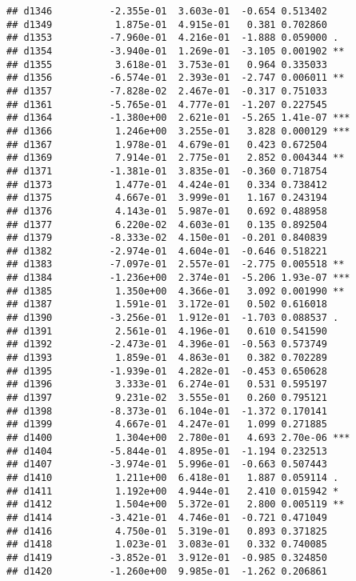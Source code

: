 \documentclass[
]{article}
\begin{document}
\begin{verbatim}
## d1346          -2.355e-01  3.603e-01  -0.654 0.513402    
## d1349           1.875e-01  4.915e-01   0.381 0.702860    
## d1353          -7.960e-01  4.216e-01  -1.888 0.059000 .  
## d1354          -3.940e-01  1.269e-01  -3.105 0.001902 ** 
## d1355           3.618e-01  3.753e-01   0.964 0.335033    
## d1356          -6.574e-01  2.393e-01  -2.747 0.006011 ** 
## d1357          -7.828e-02  2.467e-01  -0.317 0.751033    
## d1361          -5.765e-01  4.777e-01  -1.207 0.227545    
## d1364          -1.380e+00  2.621e-01  -5.265 1.41e-07 ***
## d1366           1.246e+00  3.255e-01   3.828 0.000129 ***
## d1367           1.978e-01  4.679e-01   0.423 0.672504    
## d1369           7.914e-01  2.775e-01   2.852 0.004344 ** 
## d1371          -1.381e-01  3.835e-01  -0.360 0.718754    
## d1373           1.477e-01  4.424e-01   0.334 0.738412    
## d1375           4.667e-01  3.999e-01   1.167 0.243194    
## d1376           4.143e-01  5.987e-01   0.692 0.488958    
## d1377           6.220e-02  4.603e-01   0.135 0.892504    
## d1379          -8.333e-02  4.150e-01  -0.201 0.840839    
## d1382          -2.974e-01  4.604e-01  -0.646 0.518221    
## d1383          -7.097e-01  2.557e-01  -2.775 0.005518 ** 
## d1384          -1.236e+00  2.374e-01  -5.206 1.93e-07 ***
## d1385           1.350e+00  4.366e-01   3.092 0.001990 ** 
## d1387           1.591e-01  3.172e-01   0.502 0.616018    
## d1390          -3.256e-01  1.912e-01  -1.703 0.088537 .  
## d1391           2.561e-01  4.196e-01   0.610 0.541590    
## d1392          -2.473e-01  4.396e-01  -0.563 0.573749    
## d1393           1.859e-01  4.863e-01   0.382 0.702289    
## d1395          -1.939e-01  4.282e-01  -0.453 0.650628    
## d1396           3.333e-01  6.274e-01   0.531 0.595197    
## d1397           9.231e-02  3.555e-01   0.260 0.795121    
## d1398          -8.373e-01  6.104e-01  -1.372 0.170141    
## d1399           4.667e-01  4.247e-01   1.099 0.271885    
## d1400           1.304e+00  2.780e-01   4.693 2.70e-06 ***
## d1404          -5.844e-01  4.895e-01  -1.194 0.232513    
## d1407          -3.974e-01  5.996e-01  -0.663 0.507443    
## d1410           1.211e+00  6.418e-01   1.887 0.059114 .  
## d1411           1.192e+00  4.944e-01   2.410 0.015942 *  
## d1412           1.504e+00  5.372e-01   2.800 0.005119 ** 
## d1414          -3.421e-01  4.746e-01  -0.721 0.471049    
## d1416           4.750e-01  5.319e-01   0.893 0.371825    
## d1418           1.023e-01  3.083e-01   0.332 0.740085    
## d1419          -3.852e-01  3.912e-01  -0.985 0.324850    
## d1420          -1.260e+00  9.985e-01  -1.262 0.206861    

\end{verbatim}
\end{document}

